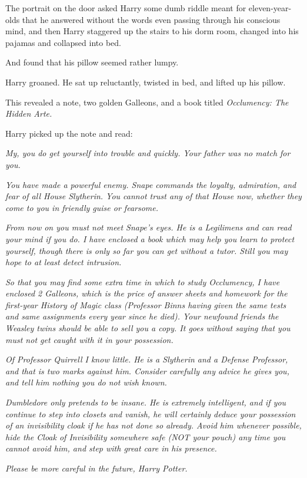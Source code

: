 The portrait on the door asked Harry some dumb riddle meant for eleven-year-olds that he answered without the words even passing through his conscious mind, and then Harry staggered up the stairs to his dorm room, changed into his pajamas and collapsed into bed.

And found that his pillow seemed rather lumpy.

Harry groaned. He sat up reluctantly, twisted in bed, and lifted up his pillow.

This revealed a note, two golden Galleons, and a book titled \emph{Occlumency: The Hidden Arte.}

Harry picked up the note and read:

\emph{My, you do get yourself into trouble and quickly. Your father was no match for you.}

\emph{You have made a powerful enemy. Snape commands the loyalty, admiration, and fear of all House Slytherin. You cannot trust any of that House now, whether they come to you in friendly guise or fearsome.}

\emph{From now on you must not meet Snape's eyes. He is a Legilimens and can read your mind if you do. I have enclosed a book which may help you learn to protect yourself, though there is only so far you can get without a tutor. Still you may hope to at least detect intrusion.}

\emph{So that you may find some extra time in which to study Occlumency, I have enclosed 2 Galleons, which is the price of answer sheets and homework for the first-year History of Magic class (Professor Binns having given the same tests and same assignments every year since he died). Your newfound friends the Weasley twins should be able to sell you a copy. It goes without saying that you must not get caught with it in your possession.}

\emph{Of Professor Quirrell I know little. He is a Slytherin and a Defense Professor, and that is two marks against him. Consider carefully any advice he gives you, and tell him nothing you do not wish known.}

\emph{Dumbledore only pretends to be insane. He is extremely intelligent, and if you continue to step into closets and vanish, he will certainly deduce your possession of an invisibility cloak if he has not done so already. Avoid him whenever possible, hide the Cloak of Invisibility somewhere safe (NOT your pouch) any time you cannot avoid him, and step with great care in his presence.}

\emph{Please be more careful in the future, Harry Potter.}

